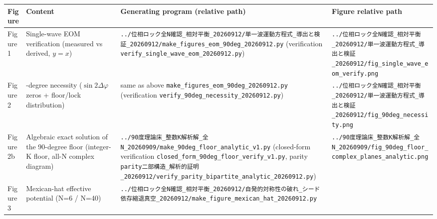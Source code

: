 \documentclass[
  a4paper,
]{ltjsarticle}
\newcounter{none} %
\begin{document}
{\def\LTcaptype{none} %
\begin{longtable}[]{@{}
  >{\raggedright\arraybackslash}p{}
  >{\raggedright\arraybackslash}p{}
  >{\raggedright\arraybackslash}p{}
  >{\raggedright\arraybackslash}p{}@{}}
\toprule\noalign{}
\begin{minipage}[b]{\linewidth}\raggedright
Figure
\end{minipage} & \begin{minipage}[b]{\linewidth}\raggedright
Content
\end{minipage} & \begin{minipage}[b]{\linewidth}\raggedright
Generating program (relative path)
\end{minipage} & \begin{minipage}[b]{\linewidth}\raggedright
Figure relative path
\end{minipage} \\
\midrule\noalign{}
\endhead
\bottomrule\noalign{}
\endlastfoot
Figure 1 & Single-wave EOM verification (measured vs derived, \(y=x\)) &
\texttt{../位相ロック全N確認\_相対平衡\_20260912/単一波運動方程式\_導出と検証\_20260912/make\_figures\_eom\_90deg\_20260912.py}
(verification \texttt{verify\_single\_wave\_eom\_20260912.py}) &
\texttt{../位相ロック全N確認\_相対平衡\_20260912/単一波運動方程式\_導出と検証\_20260912/fig\_single\_wave\_eom\_verify.png} \\
Figure 2 & 90-degree necessity (\(\sin2\Delta\varphi\) zeros +
floor/lock distribution) & same as above
\texttt{make\_figures\_eom\_90deg\_20260912.py} (verification
\texttt{verify\_90deg\_necessity\_20260912.py}) &
\texttt{../位相ロック全N確認\_相対平衡\_20260912/単一波運動方程式\_導出と検証\_20260912/fig\_90deg\_necessity.png} \\
Figure 2b & Algebraic exact solution of the 90-degree floor (integer-K
floor, all-N complex diagram) &
\texttt{../90度理論床\_整数K解析解\_全N\_20260909/make\_90deg\_floor\_analytic\_v1.py}
(closed-form verification
\texttt{closed\_form\_90deg\_floor\_verify\_v1.py}, parity
\texttt{parity二部構造\_解析的証明\_20260912/verify\_parity\_bipartite\_analytic\_20260912.py})
&
\texttt{../90度理論床\_整数K解析解\_全N\_20260909/fig\_90deg\_floor\_complex\_planes\_analytic.png} \\
Figure 3 & Mexican-hat effective potential (N=6 / N=40) &
\texttt{../位相ロック全N確認\_相対平衡\_20260912/自発的対称性の破れ\_シード依存縮退真空\_20260912/make\_figure\_mexican\_hat\_20260912.py}

\end{longtable}}
\end{document}

